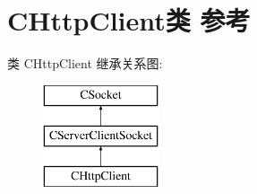 \hypertarget{class_c_http_client}{}\section{C\+Http\+Client类 参考}
\label{class_c_http_client}
类 C\+Http\+Client 继承关系图\+:\begin{figure}[H]
\begin{center}
\leavevmode
\includegraphics[height=3.000000cm]{class_c_http_client}
\end{center}
\end{figure}
